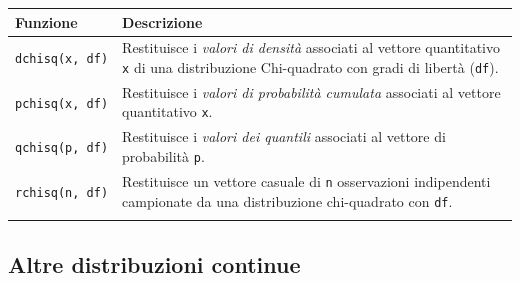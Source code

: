 \documentclass[
  ignorenonframetext,
  italian,
  compress, aspectratio=149]{beamer}
\begin{document}
\begin{frame}[fragile]{}
\label{section-26}
\begin{longtable}[]{@{}
  >{\raggedright\arraybackslash}p{}
  >{\raggedright\arraybackslash}p{}@{}}
\toprule\noalign{}
\begin{minipage}[b]{\linewidth}\raggedright
Funzione
\end{minipage} & \begin{minipage}[b]{\linewidth}\raggedright
Descrizione
\end{minipage} \\
\midrule\noalign{}
\endhead
\texttt{dchisq(x,\ df)} & Restituisce i \emph{valori di densità}
associati al vettore quantitativo \texttt{x} di una distribuzione
Chi-quadrato con gradi di libertà (\texttt{df}). \\
\texttt{pchisq(x,\ df)} & Restituisce i \emph{valori di probabilità
cumulata} associati al vettore quantitativo \texttt{x}. \\
\texttt{qchisq(p,\ df)} & Restituisce i \emph{valori dei quantili}
associati al vettore di probabilità \texttt{p}. \\
\texttt{rchisq(n,\ df)} & Restituisce un vettore casuale di \texttt{n}
osservazioni indipendenti campionate da una distribuzione chi-quadrato
con \texttt{df}. \\
\bottomrule\noalign{}
\end{longtable}
\end{frame}

\subsection{Altre distribuzioni
continue}\label{altre-distribuzioni-continue}
\end{document}
